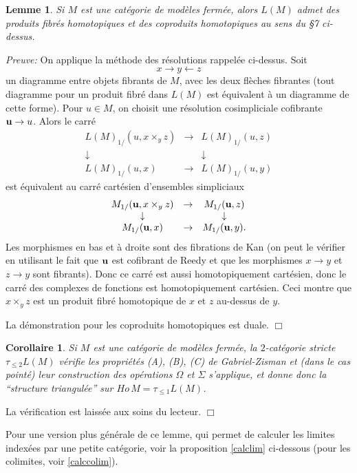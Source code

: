 \documentclass[12pt]{article}
\newcommand{\eop}{\hfill $\Box$\vspace{.1in}}
\newtheorem{lemme}[lemma]{Lemme}
\newtheorem{corollaire}[lemma]{Corollaire}
\begin{document}
\begin{lemme}
\label{prodfibhom}
Si $M$ est une cat\'egorie de mod\`eles ferm\'ee, alors $L(M)$ admet des
produits fibr\'es homotopiques et des coproduits homotopiques au sens du \S 7
ci-dessus.
\end{lemme}
{\em Preuve:}
On applique la m\'ethode des r\'esolutions rappel\'ee
ci-dessus. Soit
$$
x\rightarrow y\leftarrow z
$$
un diagramme entre objets  fibrants de $M$, avec les deux fl\`eches fibrantes
(tout diagramme pour un produit fibr\'e dans $L(M)$ est \'equivalent \`a un
diagramme de cette forme). Pour $u\in M$, on choisit une r\'esolution
cosimpliciale cofibrante ${\bf u}\rightarrow u$. Alors le carr\'e
$$
\begin{array}{ccc}
L(M)_{1/}(u, x\times _yz)& \rightarrow & L(M)_{1/}(u, z)\\
\downarrow && \downarrow \\
L(M)_{1/}(u, x)& \rightarrow & L(M)_{1/}(u, y)
\end{array}
$$
est \'equivalent au
carr\'e  cart\'esien d'ensembles simpliciaux
$$
\begin{array}{ccc}
M_{1/}({\bf u}, x\times _yz)& \rightarrow & M_{1/}({\bf u}, z)\\
\downarrow && \downarrow \\
M_{1/}({\bf u}, x)& \rightarrow & M_{1/}({\bf u}, y) .
\end{array}
$$
Les morphismes en bas et \`a droite sont des fibrations de Kan
(on peut le v\'erifier en utilisant le fait que ${\bf u}$ est cofibrant de
Reedy et que les morphismes $x\rightarrow y$
et $z\rightarrow y$ sont fibrants). Donc ce carr\'e est aussi
homotopiquement cart\'esien, donc le carr\'e des complexes de fonctions est
homotopiquement cart\'esien. Ceci montre que $x\times_yz$ est un produit fibr\'e
homotopique de $x$ et $z$ au-dessus de $y$.

La d\'emonstration pour les coproduits homotopiques est duale.
\eop

\begin{corollaire}
\label{gzpourM}
Si $M$ est une cat\'egorie de mod\`eles ferm\'ee,
la $2$-cat\'egorie stricte $\tau _{\leq 2} L(M)$ v\'erifie les
propri\'et\'es (A), (B), (C) de Gabriel-Zisman et (dans  le cas point\'e) leur
construction  des op\'erations $\Omega$ et $\Sigma$
s'applique, et donne donc la ``structure triangul\'ee'' sur $Ho\, M=\tau _{\leq
1} L(M)$.
\end{corollaire}
La v\'erification est laiss\'ee aux soins du lecteur.
\eop

Pour une version plus g\'en\'erale de ce lemme, qui permet de calculer les
limites index\'ees par une petite cat\'egorie, voir la proposition \ref{calclim}
ci-dessous (pour les colimites, voir \ref{calccolim}).
\end{document}
